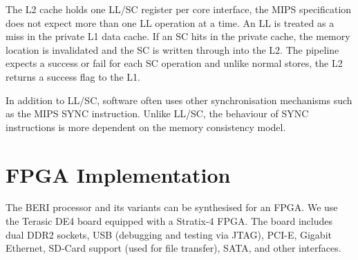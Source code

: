 		The L2 cache holds one LL/SC register per core interface, the MIPS specification does not expect more than one LL operation at a time. An LL is treated as a miss in the private L1 data cache. If an SC hits in the private cache, the memory location is invalidated and the SC is written through into the L2. The pipeline expects a success or fail for each SC operation and unlike normal stores, the L2 returns a success flag to the L1.
		
		In addition to LL/SC, software often uses other synchronisation mechanisms such as the MIPS SYNC instruction. Unlike LL/SC, the behaviour of SYNC instructions is more dependent on the memory consistency model.

\section{FPGA Implementation}
	\label{fpga_implementation}
	The BERI processor and its variants can be synthesised for an FPGA. We use the Terasic DE4 board equipped with a Stratix-4 FPGA. The board includes dual DDR2 sockets, USB (debugging and testing via JTAG), PCI-E, Gigabit Ethernet, SD-Card support (used for file transfer), SATA, and other interfaces.
	
